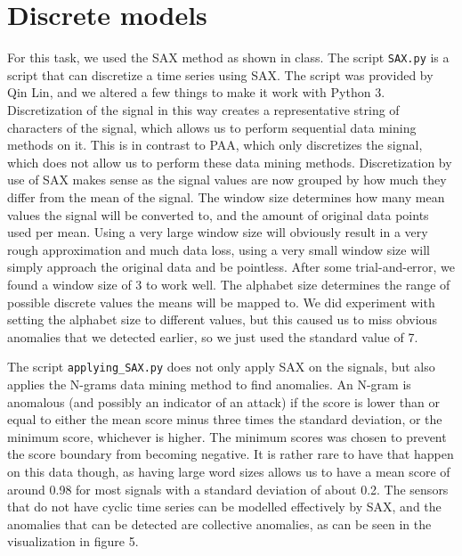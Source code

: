 \documentclass[]{article}
\begin{document}
\section{Discrete models}
For this task, we used the SAX method as shown in class. The script \texttt{SAX.py} is a script that can discretize a time series using SAX. The script was provided by Qin Lin, and we altered a few things to make it work with Python 3. Discretization of the signal in this way creates a representative string of characters of the signal, which allows us to perform sequential data mining methods on it. This is in contrast to PAA, which only discretizes the signal, which does not allow us to perform these data mining methods. Discretization by use of SAX makes sense as the signal values are now grouped by how much they differ from the mean of the signal. The window size determines how many mean values the signal will be converted to, and the amount of original data points used per mean. Using a very large window size will obviously result in a very rough approximation and much data loss, using a very small window size will simply approach the original data and be pointless. After some trial-and-error, we found a window size of 3 to work well. The alphabet size determines the range of possible discrete values the means will be mapped to. We did experiment with setting the alphabet size to different values, but this caused us to miss obvious anomalies that we detected earlier, so we just used the standard value of 7.

The script \texttt{applying\_SAX.py} does not only apply SAX on the signals, but also applies the N-grams data mining method to find anomalies. An N-gram is anomalous (and possibly an indicator of an attack) if the score is lower than or equal to either the mean score minus three times the standard deviation, or the minimum score, whichever is higher. The minimum scores was chosen to prevent the score boundary from becoming negative. It is rather rare to have that happen on this data though, as having large word sizes allows us to have a mean score of around 0.98 for most signals with a standard deviation of about 0.2. The sensors that do not have cyclic time series can be modelled effectively by SAX, and the anomalies that can be detected are collective anomalies, as can be seen in the visualization in figure 5.
\clearpage
\end{document}
